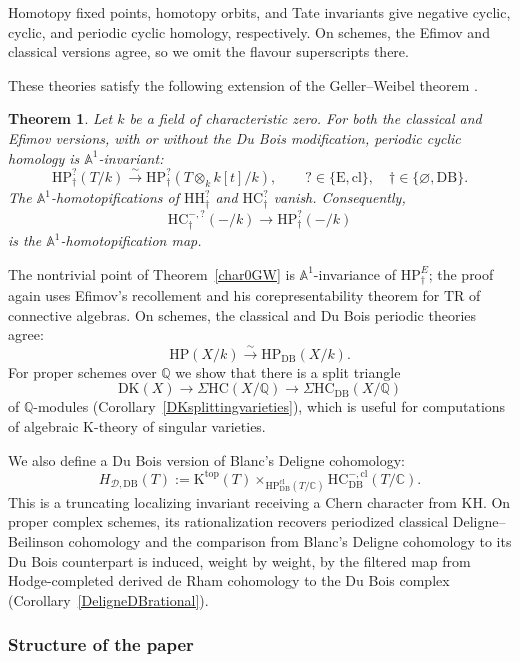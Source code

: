 \documentclass{amsart}
\theoremstyle{plain}
\newtheorem{theorem}[prop]{Theorem}
\theoremstyle{definition}
\newcommand{\bbA}{\mathbb{A}}
\newcommand{\bbC}{\mathbb{C}}
\newcommand{\bbQ}{\mathbb{Q}}
\newcommand{\HH}{\mathrm{HH}}
\newcommand{\HC}{\mathrm{HC}}
\newcommand{\HP}{\mathrm{HP}}
\newcommand{\K}{\mathrm{K}}
\newcommand{\KH}{\mathrm{KH}}
\newcommand{\DK}{\mathrm{DK}}
\newcommand{\TR}{\mathrm{TR}}
\newcommand{\DB}{\mathrm{DB}}
\newcommand{\cl}{\mathrm{cl}}
\begin{document}
Homotopy fixed points, homotopy orbits, and Tate invariants give negative cyclic, cyclic, and periodic cyclic homology, respectively. On schemes, the Efimov and classical versions agree, so we omit the flavour superscripts there.

These theories satisfy the following extension of the Geller--Weibel theorem \cite{GW89}.

\begin{theorem}\label{thmintroperiodic}
Let $k$ be a field of characteristic zero.
For both the classical and Efimov versions, with or without the Du Bois modification, periodic cyclic homology is $\bbA^1$-invariant:
\[
\HP^?_\dagger(T/k)
\xrightarrow{\sim}
\HP^?_\dagger(T\otimes_k k[t]/k),
\qquad
?\in\{\mathrm E,\cl\},
\quad
\dagger\in\{\varnothing,\DB\}.
\]
The $\bbA^1$-homotopifications of
$\HH^?_\dagger$ and $\HC^?_\dagger$ vanish.
Consequently,
\[
\HC^{-,?}_\dagger(-/k)
\longrightarrow
\HP^?_\dagger(-/k)
\]
is the $\bbA^1$-homotopification map.
\end{theorem}

The nontrivial point of Theorem~\ref{char0GW} is $\bbA^1$-invariance of $\HP^E_\dagger$; the proof again uses Efimov's recollement and his corepresentability theorem for $\TR$ of connective algebras.
On schemes, the classical and Du Bois periodic theories agree:
\[
\HP(X/k)\xrightarrow{\sim}\HP_{\DB}(X/k).
\]
For proper schemes over
$\bbQ$ we show that there is a split triangle
\[
\DK(X)\longrightarrow\Sigma\HC(X/\bbQ)
\longrightarrow\Sigma\HC_{\DB}(X/\bbQ)
\]
of $\bbQ$-modules
(Corollary~\ref{DKsplittingvarieties}), which is useful for computations of algebraic K-theory of singular varieties.

We also define a Du Bois version of Blanc's Deligne cohomology:
\[
H_{\mathcal D,\DB}(T):=
\K^{\mathrm{top}}(T)
\mathop{\times}_{\HP^{\cl}_{\DB}(T/\bbC)}
\HC^{-,\cl}_{\DB}(T/\bbC).
\]
This is a truncating localizing invariant receiving a Chern character from $\KH$. On proper complex schemes, its rationalization recovers periodized classical Deligne--Beilinson cohomology and the comparison from Blanc's Deligne cohomology to its Du Bois counterpart is induced, weight by weight, by the filtered map from Hodge-completed derived de Rham cohomology to the Du Bois complex (Corollary~\ref{DeligneDBrational}).


\medskip

\subsubsection*{Structure of the paper}
\end{document}
